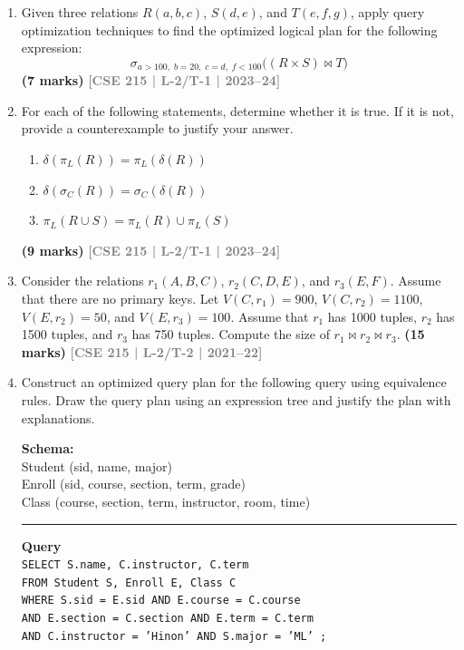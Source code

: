 \documentclass[12pt,a3paper]{article}
\newcommand{\yr}[1]{\hfill\textcolor{gray}{\small\textbf{[#1]}}}
\newcommand{\mk}[1]{\textcolor{orange!70!black}{\small\textbf{(#1 marks)}}}
\begin{document}
\begin{enumerate}

\item Given three relations $R(a, b, c)$, $S(d, e)$, and $T(e, f, g)$, apply query optimization techniques to find the optimized logical plan for the following expression:
\[\sigma_{a>100,\; b=20,\; c=d,\; f<100}\bigl((R \times S) \bowtie T\bigr)\]
\mk{7} \yr{CSE 215 | L-2/T-1 | 2023--24}

\item For each of the following statements, determine whether it is true. If it is not, provide a counterexample to justify your answer.
\begin{enumerate}
  \item $\delta(\pi_L(R)) = \pi_L(\delta(R))$
  \item $\delta(\sigma_C(R)) = \sigma_C(\delta(R))$
  \item $\pi_L(R \cup S) = \pi_L(R) \cup \pi_L(S)$
\end{enumerate}
\mk{9} \yr{CSE 215 | L-2/T-1 | 2023--24}

\item Consider the relations $r_1(A, B, C)$, $r_2(C, D, E)$, and $r_3(E, F)$. Assume that there are no primary keys. Let $V(C, r_1) = 900$, $V(C, r_2) = 1100$, $V(E, r_2) = 50$, and $V(E, r_3) = 100$. Assume that $r_1$ has 1000 tuples, $r_2$ has 1500 tuples, and $r_3$ has 750 tuples. Compute the size of $r_1 \bowtie r_2 \bowtie r_3$.
\mk{15} \yr{CSE 215 | L-2/T-2 | 2021--22}

\item Construct an optimized query plan for the following query using equivalence rules. Draw the query plan using an expression tree and justify the plan with explanations.


\vspace{0.2cm}
\textbf{Schema:} \\
Student (sid, name, major) \\
Enroll (sid, course, section, term, grade) \\
Class (course, section, term, instructor, room, time)

\vspace{0.2cm}
\hrule
\vspace{0.2cm}

\textbf{Query} \\
\texttt{SELECT S.name, C.instructor, C.term} \\
\texttt{FROM Student S, Enroll E, Class C} \\
\texttt{WHERE S.sid = E.sid AND E.course = C.course} \\
\texttt{AND E.section = C.section AND E.term = C.term} \\
\texttt{AND C.instructor = 'Hinon' AND S.major = 'ML' ;}


\end{enumerate}
\end{document}
